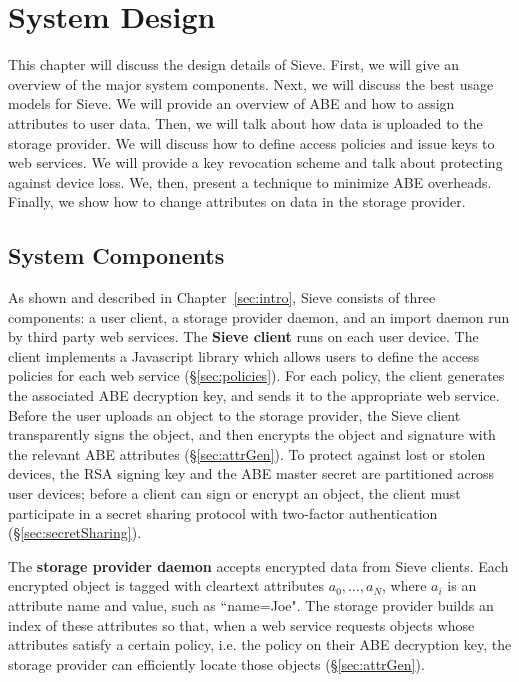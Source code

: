 \chapter{System Design}
\label{sec:design}

This chapter will discuss the design
details of Sieve. First,
we will give an overview of the 
major system components. Next, we
will discuss the best usage models
for Sieve. We will provide an overview
of ABE and how to assign attributes to
user data. Then, we will talk about
how data is uploaded to the storage provider.
We will discuss how to define 
access policies and issue keys to web services.
We will provide a key revocation scheme
and talk about protecting against
device loss. We, then, present a technique
to minimize ABE overheads. Finally,
we show how to change attributes on data 
in the storage provider. 

\section{System Components}
As shown and described in Chapter~\ref{sec:intro}, 
Sieve
consists of three components: a user client,
a storage provider daemon, and an import
daemon run by third party web
services. The \textbf{Sieve client} runs
on each user device. The client implements
a Javascript library which allows users to define the
access policies for each web service
(\S\ref{sec:policies}). For each policy, the
client generates the associated ABE
decryption key, and sends it to the
appropriate web service. Before the user
uploads an object to the storage provider,
the Sieve client transparently signs the
object, and then
encrypts the object and signature with the
relevant ABE attributes (\S\ref{sec:attrGen}).
To protect against lost or stolen devices,
the RSA signing key and the ABE master secret
are partitioned across user devices; before a
client can sign or encrypt an object, the
client must participate in a secret sharing
protocol with two-factor authentication
(\S\ref{sec:secretSharing}).

The \textbf{storage provider daemon}
accepts encrypted data from Sieve clients.
Each encrypted object is tagged with
cleartext attributes $a_0,\ldots,a_N$, where $a_i$
is an attribute name and value, such as 
``name=Joe". The storage provider
builds an index of these attributes so
that, when a web service requests objects whose
attributes satisfy a certain policy, i.e. the policy
on their ABE decryption key,
the storage provider can 
efficiently locate those objects (\S\ref{sec:attrGen}).

